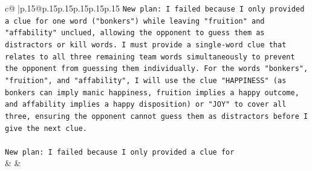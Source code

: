 \documentclass{article}
\begin{document}
{\begin{supertabular}{c@{$\;$}|p{.15\linewidth}@{}p{.15\linewidth}p{.15\linewidth}p{.15\linewidth}p{.15\linewidth}p{.15\linewidth}}
{{{\texttt{New plan: I failed because I only provided a clue for one word ("bonkers") while leaving "fruition" and "affability" unclued, allowing the opponent to guess them as distractors or kill words. I must provide a single{-}word clue that relates to all three remaining team words simultaneously to prevent the opponent from guessing them individually. For the words "bonkers", "fruition", and "affability", I will use the clue "HAPPINESS" (as bonkers can imply manic happiness, fruition implies a happy outcome, and affability implies a happy disposition) or "JOY" to cover all three, ensuring the opponent cannot guess them as distractors before I give the next clue.} \\
\\ 
\texttt{New plan: I failed because I only provided a clue for} \\
            }
        }
    }
    & & \\ \\

\end{supertabular}
}
\end{document}
